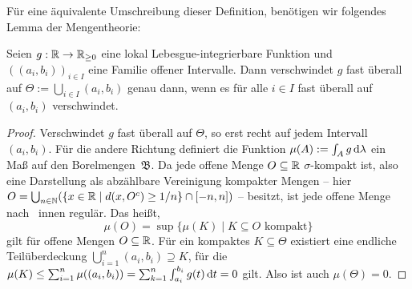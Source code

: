 Für eine äquivalente Umschreibung dieser Definition, benötigen wir folgendes Lemma der Mengentheorie:

\begin{lemma}\label{lemma-vanishes-intervals}
	Seien $g: \mathbb{R} \to \mathbb{R}_{\geq 0}$ eine lokal Lebesgue-integrierbare Funktion und $((a_i, b_i))_{i\in I}$ eine Familie offener Intervalle.
	Dann verschwindet $g$ fast überall auf $\Theta:=\bigcup_{i\in I} (a_i, b_i)$ genau dann, wenn es für alle $i\in I$ fast überall auf $(a_i, b_i)$ verschwindet.
\end{lemma}
\begin{proof}
	Verschwindet $g$ fast überall auf $\Theta$, so erst recht auf jedem Intervall $(a_i, b_i)$.
	Für die andere Richtung definiert die Funktion $\mu(A):= \int_A g \mathop{}\!\mathrm{d} \lambda$ ein Maß auf den Borelmengen~$\mathfrak{B}$.
	Da jede offene Menge $O\subseteq\mathbb{R}$ $\sigma$-kompakt ist, also eine Darstellung als abzählbare Vereinigung kompakter Mengen -- hier $O=\bigcup_{n\in\mathbb{N}}(\{ x \in\mathbb{R} \mid d(x, O^c) \geq 1/n \} \cap [-n, n] )$ -- besitzt, ist jede offene Menge nach~\cite[1.2 Folgerungen (e)]{Elstrodt2011Top} innen regulär.
	Das heißt,
	$$\mu(O)=\sup\{ \mu(K) \mid K\subseteq O \text{ kompakt} \}$$
	gilt für offene Mengen $O\subseteq\mathbb{R}$.
	Für ein kompaktes $K\subseteq \Theta$ existiert eine endliche Teil\-über\-deckung $\bigcup_{i=1}^n (a_i, b_i) \supseteq K$, für die $\mu(K) \leq \sum_{i=1}^{n} \mu((a_i, b_i)) = \sum_{k=1}^{n} \int_{a_i}^{b_i} g(t) \mathop{}\!\mathrm{d} t = 0$ gilt.
	Also ist auch $\mu(\Theta)=0$.
\end{proof}

